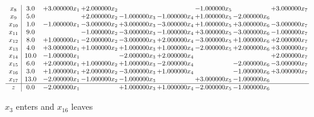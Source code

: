 \documentclass[10pt]{article}
\begin{document}
\[\begin{array}{c| c c@{\hskip 2pt} c@{\hskip 2pt} c@{\hskip 2pt} c@{\hskip 2pt} c@{\hskip 2pt} c@{\hskip 2pt} c@{\hskip 2pt} }
 x_{8}   &  3.0 & + 3.000000 x_{1} & + 2.000000 x_{2} &    &   & -1.000000 x_{5} &   & + 3.000000 x_{7}\\
 x_{9}   &  5.0  &   & + 2.000000 x_{2} & -1.000000 x_{3} & -1.000000 x_{4} & + 1.000000 x_{5} & -2.000000 x_{6} &   \\
 x_{10}   &  1.0 & -1.000000 x_{1} & -3.000000 x_{2} & + 3.000000 x_{3} & -3.000000 x_{4} & + 1.000000 x_{5} & + 3.000000 x_{6} & -3.000000 x_{7}\\
 x_{11}   &  9.0  &   & -1.000000 x_{2} & -3.000000 x_{3} & -1.000000 x_{4} & + 3.000000 x_{5} & -3.000000 x_{6} & -1.000000 x_{7}\\
 x_{12}   &  8.0 & + 1.000000 x_{1} & -2.000000 x_{2} & -3.000000 x_{3} & + 2.000000 x_{4} & -3.000000 x_{5} & + 1.000000 x_{6} & + 2.000000 x_{7}\\
 x_{13}   &  4.0 & + 3.000000 x_{1} & + 1.000000 x_{2} & + 1.000000 x_{3} & + 1.000000 x_{4} & -2.000000 x_{5} & + 2.000000 x_{6} & + 3.000000 x_{7}\\
 x_{14}   &  10.0 & -1.000000 x_{1} &   & -2.000000 x_{3} & + 2.000000 x_{4} &    &   & + 2.000000 x_{7}\\
 x_{15}   &  6.0 & + 2.000000 x_{1} & + 1.000000 x_{2} & + 1.000000 x_{3} & -2.000000 x_{4} &   & -2.000000 x_{6} & -3.000000 x_{7}\\
 x_{16}   &  3.0 & + 1.000000 x_{1} & + 2.000000 x_{2} & -3.000000 x_{3} & + 1.000000 x_{4} &   & -1.000000 x_{6} & + 3.000000 x_{7}\\
 x_{17}   &  13.0 & -2.000000 x_{1} & -1.000000 x_{2} & -1.000000 x_{3} &   & + 3.000000 x_{5} & -1.000000 x_{6} &   \\
\hline
z    &  0.0 & -2.000000 x_{1} &   & + 1.000000 x_{3} & + 1.000000 x_{4} & -2.000000 x_{5} & -1.000000 x_{6} &   \\
\end{array}\]


 $ x_{3} $ enters and $ x_{16} $ leaves 
\end{document}
